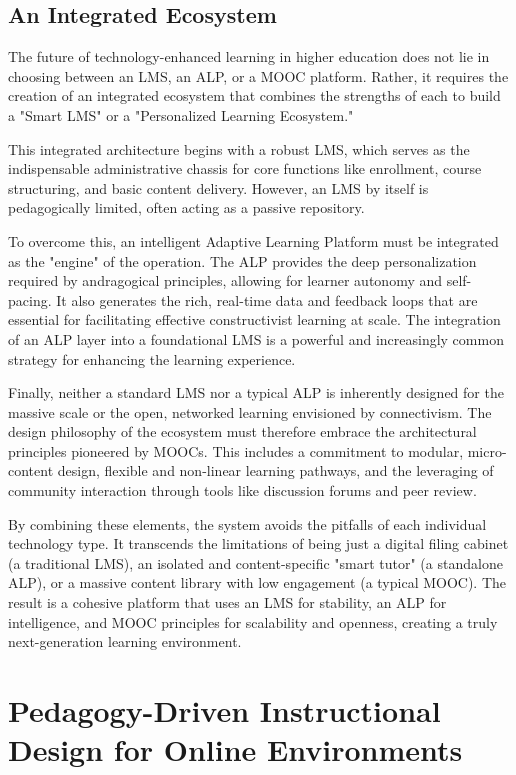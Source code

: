 \documentclass{article}
\begin{document}
\subsection{An Integrated Ecosystem}

The future of technology-enhanced learning in higher education does not lie in choosing between an LMS, an ALP, or a MOOC platform. Rather, it requires the creation of an integrated ecosystem that combines the strengths of each to build a "Smart LMS" or a "Personalized Learning Ecosystem."

This integrated architecture begins with a robust LMS, which serves as the indispensable administrative chassis for core functions like enrollment, course structuring, and basic content delivery.\cite{25} However, an LMS by itself is pedagogically limited, often acting as a passive repository.

To overcome this, an intelligent Adaptive Learning Platform must be integrated as the "engine" of the operation. The ALP provides the deep personalization required by andragogical principles, allowing for learner autonomy and self-pacing.\cite{37} It also generates the rich, real-time data and feedback loops that are essential for facilitating effective constructivist learning at scale.\cite{34, 36} The integration of an ALP layer into a foundational LMS is a powerful and increasingly common strategy for enhancing the learning experience.\cite{33, 46}

Finally, neither a standard LMS nor a typical ALP is inherently designed for the massive scale or the open, networked learning envisioned by connectivism. The design philosophy of the ecosystem must therefore embrace the architectural principles pioneered by MOOCs. This includes a commitment to modular, micro-content design, flexible and non-linear learning pathways, and the leveraging of community interaction through tools like discussion forums and peer review.\cite{41, 44}

By combining these elements, the system avoids the pitfalls of each individual technology type. It transcends the limitations of being just a digital filing cabinet (a traditional LMS), an isolated and content-specific "smart tutor" (a standalone ALP), or a massive content library with low engagement (a typical MOOC). The result is a cohesive platform that uses an LMS for stability, an ALP for intelligence, and MOOC principles for scalability and openness, creating a truly next-generation learning environment.

\section{Pedagogy-Driven Instructional Design for Online Environments}
\end{document}
